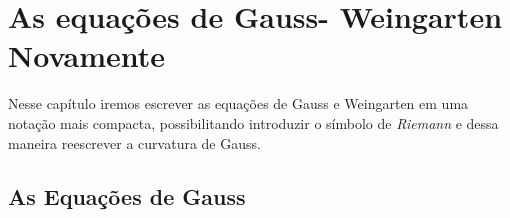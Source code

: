 ﻿%


\chapter{As equações de Gauss- Weingarten Novamente}
\label{labeldocapitulo}



Nesse capítulo iremos escrever as equações de Gauss e Weingarten em uma notação mais compacta, possibilitando introduzir o símbolo de \textsl{Riemann} e dessa maneira reescrever a curvatura de Gauss.



\section{As Equações de Gauss}



